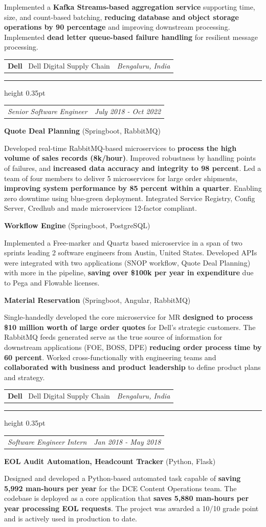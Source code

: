 \documentclass[10pt,a4paper]{article}
\makeatletter
\newcommand{\twocol}[2]{%
  \noindent\begin{tabularx}{\textwidth}{@{}X>{\raggedleft\arraybackslash}p{2.15in}@{}}
    #1 & #2
  \end{tabularx}%
}
\newcommand{\company}[3]{%
  \twocol{%
    {\fontsize{11.8pt}{13.5pt}\selectfont\textbf{#1}}%
    \hspace{0.45em}%
    {\fontsize{10.8pt}{13.5pt}\selectfont
     \color{black!65}\textbar\ #2}%
  }{\textit{#3}}\par
  \vspace{0.6pt}%
  {\color{black!25}\hrule height 0.35pt}%
  \vspace{2.2pt}%
}
\newcommand{\role}[2]{%
  \twocol{\textit{#1}}{\textit{#2}}\par
  \vspace{2.4pt}%
}
\newcommand{\project}[2]{\textbf{#1} (#2)\par\vspace{2.0pt}}
\makeatother
\begin{document}
\vspace{2pt}
Implemented a \textbf{Kafka Streams-based aggregation service} supporting time, size, and count-based batching, \textbf{reducing database and object storage operations by 90 percentage} and improving downstream processing. Implemented \textbf{dead letter queue-based failure handling} for resilient message processing.

\vspace{7.4pt}
\company{Dell}{Dell Digital Supply Chain}{Bengaluru, India}
\role{Senior Software Engineer}{July 2018 - Oct 2022}
\project{Quote Deal Planning}{Springboot, RabbitMQ}
Developed real-time RabbitMQ-based microservices to \textbf{process the high volume of sales records (8k/hour)}. Improved robustness by handling points of failures, and \textbf{increased data accuracy and integrity to 98 percent}. Led a team of four members to deliver 5 microservices for large order shipments, \textbf{improving system performance by 85 percent within a quarter}. Enabling zero downtime using blue-green deployment. Integrated Service Registry, Config Server, Credhub and made microservices 12-factor compliant.

\vspace{5.0pt}
\project{Workflow Engine}{Springboot, PostgreSQL}
Implemented a Free-marker and Quartz based microservice in a span of two sprints leading 2 software engineers from Austin, United States. Developed APIs were integrated with two applications (SNOP workflow, Quote Deal Planning) with more in the pipeline, \textbf{saving over \$100k per year in expenditure} due to Pega and Flowable licenses.

\vspace{5.0pt}
\project{Material Reservation}{Springboot, Angular, RabbitMQ}
Single-handedly developed the core microservice for MR \textbf{designed to process \$10 million worth of large order quotes} for Dell's strategic customers. The RabbitMQ feeds generated serve as the true source of information for downstream applications (FOE, BOSS, DPE) \textbf{reducing order process time by 60 percent}. Worked cross-functionally with engineering teams and \textbf{collaborated with business and product leadership} to define product plans and strategy.

\vspace{7.4pt}
\company{Dell}{Dell Digital Supply Chain}{Bengaluru, India}
\role{Software Engineer Intern}{Jan 2018 - May 2018}
\project{EOL Audit Automation, Headcount Tracker}{Python, Flask}
Designed and developed a Python-based automated task capable of \textbf{saving 5,992 man-hours per year} for the DCE Content Operations team. The codebase is deployed as a core application that \textbf{saves 5,880 man-hours per year processing EOL requests}. The project was awarded a 10/10 grade point and is actively used in production to date.
\end{document}
